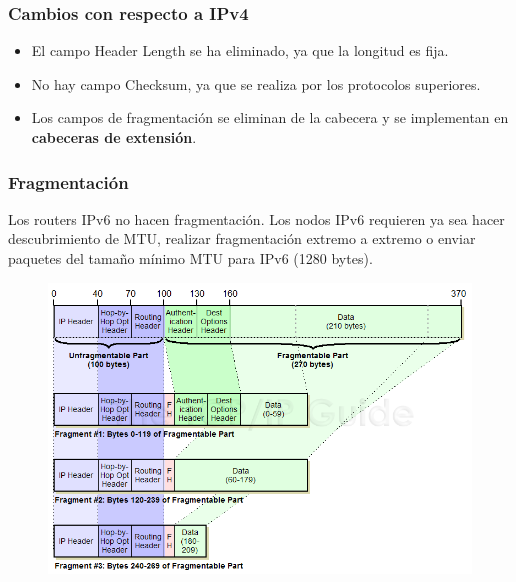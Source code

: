 \begin{onepage}
\subsubsection{Cambios con respecto a IPv4}
\begin{itemize}
    \item El campo Header Length se ha eliminado, ya que la longitud es fija.
    \item No hay campo Checksum, ya que se realiza por los protocolos superiores.
    \item Los campos de fragmentación se eliminan de la cabecera y se implementan en \textbf{cabeceras de extensión}.
\end{itemize}
\subsubsection{Fragmentación}
Los routers IPv6 no hacen fragmentación. Los nodos IPv6 requieren ya sea hacer descubrimiento de MTU, realizar fragmentación extremo a extremo o enviar paquetes del tamaño mínimo MTU para IPv6 (1280 bytes).\\

\begin{figure}[H]
    \centering \includegraphics[width=\textwidth]{img/ipv6_fragm.png}
\end{figure}
\end{onepage}
